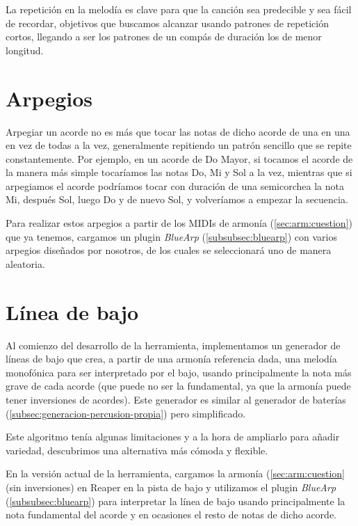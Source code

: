 La repetición en la melodía es clave para que la canción sea predecible y sea fácil de recordar, objetivos que buscamos alcanzar usando patrones de repetición cortos, llegando a ser los patrones de un compás de duración los de menor longitud.

\section{Arpegios}
Arpegiar un acorde no es más que tocar las notas de dicho acorde de una en una en vez de todas a la vez, generalmente repitiendo un patrón sencillo que se repite constantemente. Por ejemplo, en un acorde de Do Mayor, si tocamos el acorde de la manera más simple tocaríamos las notas Do, Mi y Sol a la vez, mientras que si arpegiamos el acorde podríamos tocar con duración de una semicorchea la nota Mi, después Sol, luego Do y de nuevo Sol, y volveríamos a empezar la secuencia.

Para realizar estos arpegios a partir de los MIDIs de armonía (\ref{sec:arm:cuestion}) que ya tenemos, cargamos un plugin  \textit{BlueArp} (\ref{subsubsec:bluearp}) con varios arpegios diseñados por nosotros, de los cuales se seleccionará uno de manera aleatoria.

\section{Línea de bajo}\label{sec:lineas-de-bajo}
Al comienzo del desarrollo de la herramienta, implementamos un generador de líneas de bajo que crea, a partir de una armonía referencia dada, una melodía monofónica para ser interpretado por el bajo, usando principalmente la nota más grave de cada acorde (que puede no ser la fundamental, ya que la armonía puede tener inversiones de acordes). Este generador es similar al generador de baterías (\ref{subsec:generacion-percusion-propia}) pero simplificado.

Este algoritmo tenía algunas limitaciones y a la hora de ampliarlo para añadir variedad, descubrimos una alternativa más cómoda y flexible.

En la versión actual de la herramienta, cargamos la armonía (\ref{sec:arm:cuestion} (sin inversiones) en Reaper en la pista de bajo y utilizamos el plugin \textit{BlueArp} (\ref{subsubsec:bluearp}) para interpretar la línea de bajo usando principalmente la nota fundamental del acorde y en ocasiones el resto de notas de dicho acorde.

